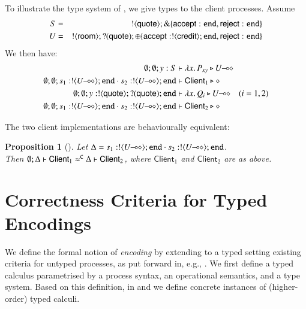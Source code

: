 \documentclass[preprint,11pt]{elsarticle}
\newtheorem{proposition}{Proposition}[section]
\newtheorem{example}{Example}[section]
\newcommand{\rtype}{\mathsf{room}}
\newcommand{\Quote}{\mathsf{quote}}
\newcommand{\accept}{\mathsf{accept}}
\newcommand{\reject}{\mathsf{reject}}
\newcommand{\creditc}{\mathsf{credit}}
\newcommand{\Client}{\mathsf{Client}}
\begin{document}
{{ 


To illustrate the type system of \HOp, we give types to the client
processes. %
Assume 
\begin{eqnarray*}
S & = & \btout{\Quote} \btbra{\accept: \tinact, \reject: \tinact} \\
U & = & \btout{\rtype} \btinp{\Quote} \btsel{\accept: \btout{\creditc} \tinact, \reject: \tinact }
\end{eqnarray*}
We then have:
\begin{align*}
\es; \es; y: S & \proves \abs{x}{P_{xy}} \hastype \lhot{U}
\\
	\es; \es; s_1: \btout{\lhot{U}} \tinact \cat s_2: \btout{\lhot{U}} \tinact & \proves \Client_1 \hastype \Proc
\\
	\es; \es; y: \btout{\Quote} \btinp{\Quote} \tinact &\proves \abs{x}{Q_i} \hastype \lhot{U}
 \quad (i=1,2)
 \\
	\es; \es; s_1: \btout{\lhot{U}} \tinact \cat s_2: \btout{\lhot{U}} \tinact & \proves \Client_2 \hastype \Proc
\end{align*}

The two client implementations are behaviourally equivalent:

\begin{proposition}[\cite{KouzapasPY17}]\label{p:examp}
	Let
	$\Delta = s_1: \btout{\lhot{U}} \tinact \cat s_2: \btout{\lhot{U}} \tinact$.
\\
	Then
	$\horel{\es}{\Delta}{\Client_1}
	{\fwb}
	{\Delta}{\Client_2}$, where $\Client_1$ and $\Client_2$ are as above.
\end{proposition}

\section{Correctness Criteria for Typed Encodings}
\label{s:expr}
%
We define the formal notion of \emph{encoding} by 
extending to a typed setting existing criteria for untyped processes, as put forward in, e.g.,
\cite{Nestmann00,Palamidessi03,DBLP:conf/lics/PalamidessiSVV06,DBLP:journals/iandc/Gorla10,DBLP:conf/icalp/LanesePSS10,DBLP:journals/tcs/FuL10,DBLP:journals/corr/abs-1208-2750,DBLP:conf/esop/PetersNG13}. 
We first define a typed calculus parametrised by a process syntax, an operational semantics, and a type system.
Based on this definition, in  
 and 
we define concrete instances of (higher-order) typed calculi.

}}
\end{document}
